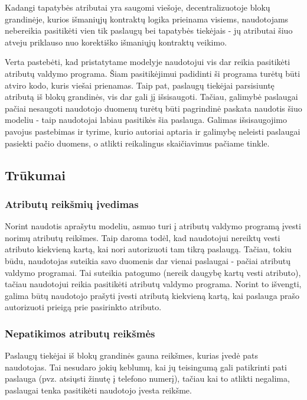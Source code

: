 Kadangi tapatybės atributai yra saugomi viešoje, decentralizuotoje blokų grandinėje, kurios išmaniųjų kontraktų
logika prieinama visiems, naudotojams nebereikia pasitikėti vien tik paslaugų bei tapatybės tiekėjais - jų
atributai šiuo atveju priklauso nuo korektiško išmaniųjų kontraktų veikimo.

Verta pastebėti, kad pristatytame modelyje naudotojui vis dar reikia pasitikėti atributų valdymo programa. Šiam pasitikėjimui
padidinti ši programa turėtų būti atviro kodo, kuris viešai prienamas. Taip pat, paslaugų tiekėjai parsisiuntę atributą
iš blokų grandinės, vis dar gali jį išsisaugoti. Tačiau, galimybė paslaugai pačiai nesaugoti naudotojo duomenų turėtų būti pagrindinė paskata
naudotis šiuo modeliu - taip naudotojai labiau pasitikės šia paslauga. Galimas išsisaugojimo pavojus pastebimas ir
\cite{MITPaper} tyrime, kurio autoriai aptaria ir galimybę neleisti paslaugai pasiekti pačio duomens, o atlikti
reikalingus skaičiavimus pačiame tinkle.

\subsection{Trūkumai}

\tocless\subsubsection{Atributų reikšmių įvedimas}

Norint naudotis aprašytu modeliu, asmuo turi į atributų valdymo programą įvesti norimų atributų reikšmes. Taip daroma todėl,
kad naudotojui nereiktų vesti atributo kiekvieną kartą, kai nori autorizuoti tam tikrą paslaugą. Tačiau, tokiu būdu,
naudotojas suteikia savo duomenis dar vienai paslaugai - pačiai atributų valdymo programai. Tai suteikia patogumo (nereik
daugybę kartų vesti atributo), tačiau naudotojui reikia pasitikėti atributų valdymo programa. Norint to išvengti,
galima būtų naudotojo prašyti įvesti atributą kiekvieną kartą, kai paslauga prašo autorizuoti prieigą prie pasirinkto atributo.

\tocless\subsubsection{Nepatikimos atributų reikšmės}

Paslaugų tiekėjai iš blokų grandinės gauna reikšmes, kurias įvedė pats naudotojas. Tai nesudaro jokių keblumų,
kai jų teisingumą gali patikrinti pati paslauga (pvz. atsiųsti žinutę į telefono numerį), tačiau kai to atlikti negalima,
paslaugai tenka pasitikėti naudotojo įvesta reikšme.

